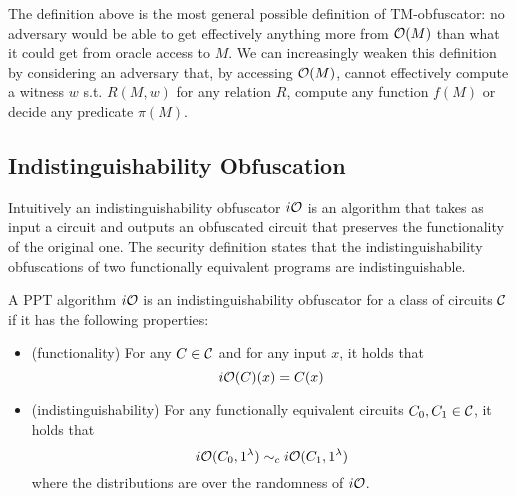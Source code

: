 The definition above is the most general possible definition of TM-obfuscator: no adversary would be able to get effectively anything more from $\mathcal{O}(M)$ than what it could get from oracle access to $M$. We can increasingly weaken this definition by considering an adversary that, by accessing $\mathcal{O}(M)$, cannot effectively compute a witness $w$ s.t. $R(M,w)$ for any relation $R$, compute any function $f(M)$ or decide any predicate $\pi(M)$.

\subsection{Indistinguishability Obfuscation}

Intuitively an indistinguishability obfuscator $i\mathcal{O}$ is an algorithm that takes as input a circuit and outputs an obfuscated circuit that preserves the functionality of the original one. The security definition states that the indistinguishability obfuscations of two functionally equivalent programs are indistinguishable.

\begin{mydef}[IO]
A PPT algorithm $i\mathcal{O}$ is an indistinguishability obfuscator for a class of circuits $\mathcal{C}$ if it has the following properties:
\begin{itemize}
\item (functionality) For any $C\in\mathcal{C}$ and for any input $x$, it holds that
\[
i\mathcal{O}(C)(x)=C(x)
\]
\item (indistinguishability) For any functionally equivalent circuits $C_0,C_1\in\mathcal{C}$, it holds that
\[
i\mathcal{O}(C_0,1^\lambda)\sim_c i\mathcal{O}(C_1,1^\lambda)
\]
where the distributions are over the randomness of $i\mathcal{O}$.
\end{itemize}
\end{mydef}



